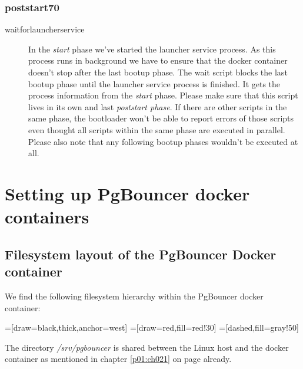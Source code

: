 			\subsubsection{poststart70}
			\begin{description}
				\item[waitforlauncherservice] In the \emph{start} phase we've started the launcher service process. As this process runs in background we have to ensure that the docker container doesn't stop after the last bootup phase. The wait script blocks the last bootup phase until the launcher service process is finished. It gets the process information from the \emph{start} phase. Please make sure that this script lives in its own and last \emph{poststart phase}. If there are other scripts in the same phase, the bootloader won't be able to report errors of those scripts even thought all scripts within the same phase are executed in parallel. Please also note that any following bootup phases wouldn't be executed at all.
			\end{description}

	\section{Setting up PgBouncer docker containers}
	
		\subsection{Filesystem layout of the PgBouncer Docker container}
		We find the following filesystem hierarchy within the PgBouncer docker container:
		
		=[draw=black,thick,anchor=west]
		=[draw=red,fill=red!30]
		=[dashed,fill=gray!50]
	
		The directory \emph{/srv/pgbouncer} is shared between the Linux host and the docker container as mentioned in chapter \ref{p01:ch021} on page \pageref{p01:ch021} already.
		
